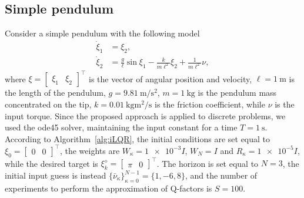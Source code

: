 \documentclass[10pt]{IEEEtran}      %
\theoremstyle{theorem}
\theoremstyle{remark}
\begin{document}
\subsection{Simple pendulum}
Consider a simple pendulum with the following model
\begin{equation}
\label{eq:pend}
\begin{aligned}
\dot{\xi}_1 &=  \xi_2,\\
\dot{\xi}_2 &=  \frac{g}{\ell}\sin \xi_1-\frac{k}{m\ell^2}\xi_2+\frac{1}{m\ell^2}\nu,
\end{aligned}
\end{equation}
where $\xi=[\begin{array}{cc}
\xi_1 & \xi_2
\end{array}]^\top$ is the vector of angular position and velocity, $\ell=\SI{1}{\meter}$ is the length of the pendulum, $g=\SI{9.81}{\meter\per\square\second}$, $m=\SI{1}{\kilogram}$ is the pendulum mass concentrated on the tip, $k=\SI{0.01}{\kilogram\square\meter\per\second}$ is the friction coefficient, while $\nu$ is the input torque. 
Since the proposed approach is applied to discrete problems, we used the ode45 solver, maintaining the input constant for a time $T=\SI{1}{\second}$. According to Algorithm~\ref{alg:iLQR}, the initial conditions are set equal to $\xi_0=[\begin{array}{cc}
0 & 0
\end{array}]^\top$, the weights are $W_\kappa=\num{1e-3} I$, $W_N=I$ and $R_\kappa=\num{1e-5}I$, while the desired target is $\xi_k^\diamond = [\begin{array}{cc}
\pi &  0
\end{array}]^\top$. The horizon is set equal to $N=3$, the initial input guess is instead $\{\bar{\nu}_\kappa\}_{\kappa=0}^{N-1}=\{
1 ,-6 ,8 \}$, and the number of experiments to perform the approximation of Q-factors is $S=\num{100}$.
\end{document}
